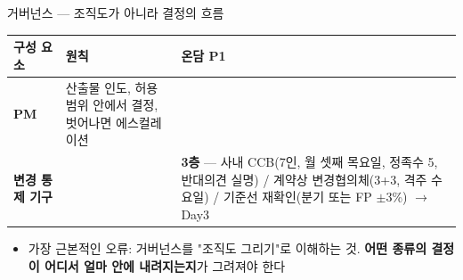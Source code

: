 \begin{frame}[allowframebreaks=1.0]{거버넌스 — 조직도가 아니라 결정의 흐름}
{\begin{tabular}{@{}>{\raggedright\arraybackslash}p{}>{\raggedright\arraybackslash}p{}>{\raggedright\arraybackslash}p{}@{}}
\toprule
\textbf{구성 요소} & \textbf{원칙} & \textbf{온담 P1} \\
\midrule
\textbf{PM} & 산출물 인도, 허용범위 안에서 결정, 벗어나면 에스컬레이션 &  \\
\textbf{변경 통제 기구} &  & \textbf{3층} — 사내 CCB(7인, 월 셋째 목요일, 정족수 5, 반대의견 실명) / 계약상 변경협의체(3+3, 격주 수요일) / 기준선 재확인(분기 또는 FP $\pm$3\%) $\rightarrow$ Day3 \\
\bottomrule
\end{tabular}}
\par\smallskip
\begin{itemize}
\item\relax 가장 근본적인 오류: 거버넌스를 "조직도 그리기"로 이해하는 것. \textbf{어떤 종류의 결정이 어디서 얼마 안에 내려지는지}가 그려져야 한다
\end{itemize}
\end{frame}

